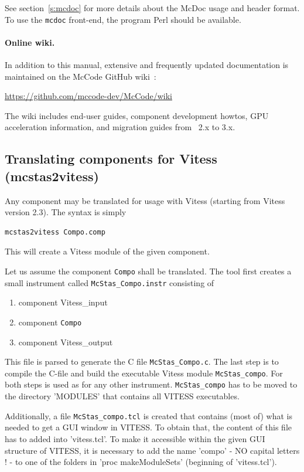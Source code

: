 See section~\ref{s:mcdoc} for more details about the McDoc usage and header
format.  To use the \verb+mcdoc+ front-end, the program Perl should be
available.

\paragraph{Online wiki.}
In addition to this manual, extensive and frequently updated documentation
is maintained on the McCode GitHub wiki~\cite{Wiki}:
\begin{center}
  \url{https://github.com/mccode-dev/McCode/wiki}
\end{center}
The wiki includes end-user guides, component development howtos, GPU
acceleration information, and migration guides from \McStas~2.x to 3.x.


\subsection{Translating \MCS components for Vitess (mcstas2vitess)}
\label{s:mcstas2vitess}

Any \MCS component may be translated for usage with Vitess (starting from
Vitess version 2.3). The syntax is simply 
\begin{lstlisting}
mcstas2vitess Compo.comp
\end{lstlisting}
This will create a Vitess module of the given component.

Let us assume the component \verb+Compo+ shall be translated. The tool first
creates a small instrument called \verb+McStas_Compo.instr+ consisting of
\begin{enumerate}
\item component Vitess\_input
\item component \verb+Compo+
\item component Vitess\_output
\end{enumerate}

This file is parsed to generate the C file \verb+McStas_Compo.c+. The last step
is to compile the C-file and build the executable Vitess module
\verb'McStas_compo'. For both steps \MCS is used as for any other
instrument. \verb'McStas_compo' has to be moved to the directory 'MODULES' that
contains all VITESS executables.

Additionally, a file \verb'McStas_compo.tcl' is created that contains (most of)
what is needed to get a GUI window in VITESS. To obtain that, the content of
this file has to added into 'vitess.tcl'. To make it accessible within the given
GUI structure of VITESS, it is necessary to add the name 'compo' - NO capital
letters ! - to one of the folders in 'proc makeModuleSets{}' (beginning of
'vitess.tcl').

